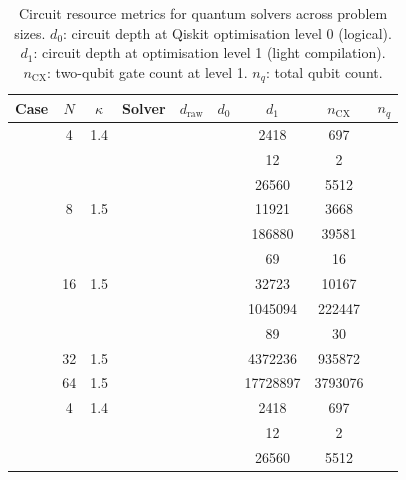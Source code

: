 \begin{table}[htbp]
  \centering
  \caption{Circuit resource metrics for quantum solvers across problem sizes. $d_0$: circuit depth at Qiskit optimisation level 0 (logical). $d_1$: circuit depth at optimisation level 1 (light compilation). $n_\mathrm{CX}$: two-qubit gate count at level 1. $n_q$: total qubit count.}
  \label{tab:circuit_resources}
  \begin{tabular}{l S[table-format=3.0] S[table-format=4.1] l S[table-format=6.0] S[table-format=6.0] S[table-format=6.0] S[table-format=5.0] S[table-format=2.0]}
    \toprule
    {Case} & {$N$} & {$\kappa$} & {Solver} & {$d_\mathrm{raw}$} & {$d_0$} & {$d_1$} & {$n_\mathrm{CX}$} & {$n_q$} \\
    \midrule
     & 4 & 1.4 &  & {\text{---}} & {\text{---}} & 2418 & 697 & {\text{---}} \\
     &  &  &  & {\text{---}} & {\text{---}} & 12 & 2 & {\text{---}} \\
     &  &  &  & {\text{---}} & {\text{---}} & 26560 & 5512 & {\text{---}} \\
     & 8 & 1.5 &  & {\text{---}} & {\text{---}} & 11921 & 3668 & {\text{---}} \\
     &  &  &  & {\text{---}} & {\text{---}} & 186880 & 39581 & {\text{---}} \\
     &  &  &  & {\text{---}} & {\text{---}} & 69 & 16 & {\text{---}} \\
     & 16 & 1.5 &  & {\text{---}} & {\text{---}} & 32723 & 10167 & {\text{---}} \\
     &  &  &  & {\text{---}} & {\text{---}} & 1045094 & 222447 & {\text{---}} \\
     &  &  &  & {\text{---}} & {\text{---}} & 89 & 30 & {\text{---}} \\
     & 32 & 1.5 &  & {\text{---}} & {\text{---}} & 4372236 & 935872 & {\text{---}} \\
     & 64 & 1.5 &  & {\text{---}} & {\text{---}} & 17728897 & 3793076 & {\text{---}} \\
    \midrule
     & 4 & 1.4 &  & {\text{---}} & {\text{---}} & 2418 & 697 & {\text{---}} \\
     &  &  &  & {\text{---}} & {\text{---}} & 12 & 2 & {\text{---}} \\
     &  &  &  & {\text{---}} & {\text{---}} & 26560 & 5512 & {\text{---}} \\

\end{tabular}
\end{table}
